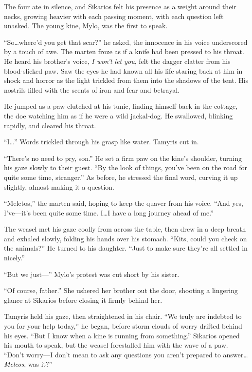 The four ate in silence, and Sikarios felt his presence as a weight around their necks, growing heavier with each passing moment, with each question left unasked. The young kine, Mylo, was the first to speak.

``So\ldots{}where'd you get that scar?'' he asked, the innocence in his voice underscored by a touch of awe. The marten froze as if a knife had been pressed to his throat. He heard his brother's voice, \emph{I won't let you}, felt the dagger clatter from his blood-slicked paw. Saw the eyes he had known all his life staring back at him in shock and horror as the light trickled from them into the shadows of the tent. His nostrils filled with the scents of iron and fear and betrayal.

He jumped as a paw clutched at his tunic, finding himself back in the cottage, the doe watching him as if he were a wild jackal-dog. He swallowed, blinking rapidly, and cleared his throat.

``I\ldots'' Words trickled through his grasp like water. Tamyris cut in.

``There's no need to pry, son.'' He set a firm paw on the kine's shoulder, turning his gaze slowly to their guest. ``By the look of things, you've been on the road for quite some time, stranger.'' As before, he stressed the final word, curving it up slightly, almost making it a question.

``Meletos,'' the marten said, hoping to keep the quaver from his voice. ``And yes, I've---it's been quite some time. I\ldots{}I have a long journey ahead of me.''

The weasel met his gaze coolly from across the table, then drew in a deep breath and exhaled slowly, folding his hands over his stomach. ``Kits, could you check on the animals?'' He turned to his daughter. ``Just to make sure they're all settled in nicely.''

``But we just---'' Mylo's protest was cut short by his sister.

``Of course, father.'' She ushered her brother out the door, shooting a lingering glance at Sikarios before closing it firmly behind her.

Tamyris held his gaze, then straightened in his chair. ``We truly are indebted to you for your help today,'' he began, before storm clouds of worry drifted behind his eyes. ``But I know when a kine is running from something.'' Sikarios opened his mouth to speak, but the weasel forestalled him with the wave of a paw. ``Don't worry---I don't mean to ask any questions you aren't prepared to answer\ldots{}\emph{Meleos}, was it?''

